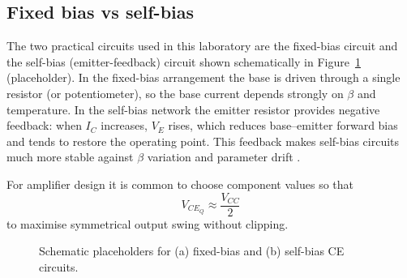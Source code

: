 \subsection{Fixed bias vs self-bias}
The two practical circuits used in this laboratory are the fixed-bias circuit and the self-bias (emitter-feedback) circuit
shown schematically in Figure~\ref{lab07_fig:fixed_self} (placeholder). In the fixed-bias arrangement the base is driven
through a single resistor (or potentiometer), so the base current depends strongly on $\beta$ and temperature. In the
self-bias network the emitter resistor provides negative feedback: when $I_C$ increases, $V_E$ rises, which reduces
base–emitter forward bias and tends to restore the operating point. This feedback makes self-bias circuits much more
stable against $\beta$ variation and parameter drift \cite{comer2002}.

For amplifier design it is common to choose component values so that
\begin{equation}
  V_{CE_Q}\approx\frac{V_{CC}}{2}
\end{equation}
to maximise symmetrical output swing without clipping.

\begin{figure}[H]
  \centering
  \caption{Schematic placeholders for (a) fixed-bias and (b) self-bias CE circuits.}
  \label{lab07_fig:fixed_self}
\end{figure}
